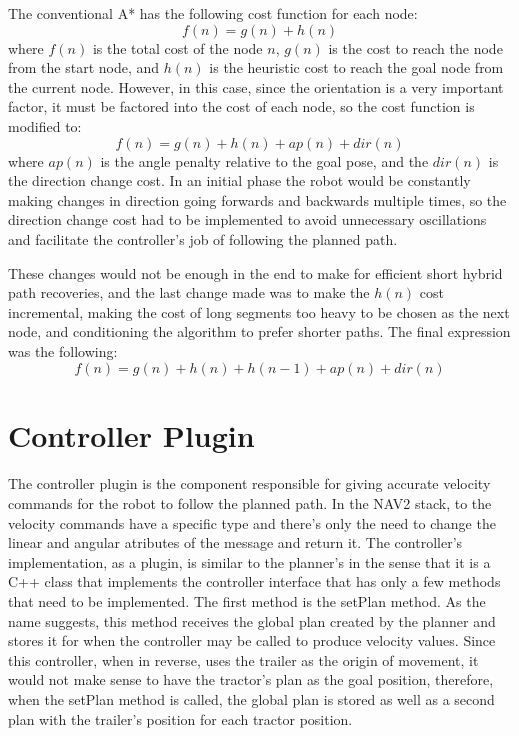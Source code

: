 The conventional A* has the following cost function for each node:
$$f(n) = g(n) + h(n)$$
where $f(n)$ is the total cost of the node $n$, $g(n)$ is the cost to reach the node from the start node, 
and $h(n)$ is the heuristic cost to reach the goal node from the current node. However, 
in this case, since the orientation is a very important factor, it must be factored 
into the cost of each node, so the cost function is modified to:
$$f(n) = g(n) + h(n) + ap(n) + dir(n)$$
where $ap(n)$ is the angle penalty relative to the goal pose, and the $dir(n)$ 
is the direction change cost. In an initial phase the robot would be constantly making 
changes in direction going forwards and backwards multiple times, so the direction 
change cost had to be implemented to avoid unnecessary oscillations and facilitate  
the controller's job of following the planned path.

These changes would not be enough in the end to make for efficient short hybrid path recoveries, 
and the last change made was to make the $h(n)$ cost incremental, making the cost 
of long segments too heavy to be chosen as the next node, and conditioning the 
algorithm to prefer shorter paths. The final expression was the following:
$$f(n) = g(n) + h(n) + h(n-1) + ap(n) + dir(n)$$


\section{Controller Plugin}
\label{sec:controller_plugin}
\paragraph{}The controller plugin is the component responsible for giving accurate 
velocity commands for the robot to follow the planned path. In the \gls{NAV2} stack, 
to the velocity commands have a specific type and there's only the need to change the linear 
and angular atributes of the message and return it. The controller's implementation, as a 
plugin, is similar to the planner's in the sense that it is a C++ class that 
implements the controller interface that has only a few methods that need to be implemented. 
The first method is the setPlan method. As the name suggests, this method receives the 
global plan created by the planner and stores it for when the controller may be called to 
produce velocity values. Since this controller, when in reverse, uses the trailer as the 
origin of movement, it would not make sense to have the tractor's plan as the goal 
position, therefore, when the setPlan method is called, the global plan is stored as well as 
a second plan with the trailer's position for each tractor position.

